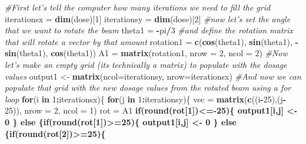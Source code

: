 \documentclass[]{article}
\newenvironment{Shaded}{\begin{snugshade}}{\end{snugshade}}
\newcommand{\KeywordTok}[1]{\textcolor[rgb]{0.13,0.29,0.53}{\textbf{#1}}}
\newcommand{\DataTypeTok}[1]{\textcolor[rgb]{0.13,0.29,0.53}{#1}}
\newcommand{\DecValTok}[1]{\textcolor[rgb]{0.00,0.00,0.81}{#1}}
\newcommand{\StringTok}[1]{\textcolor[rgb]{0.31,0.60,0.02}{#1}}
\newcommand{\CommentTok}[1]{\textcolor[rgb]{0.56,0.35,0.01}{\textit{#1}}}
\newcommand{\ControlFlowTok}[1]{\textcolor[rgb]{0.13,0.29,0.53}{\textbf{#1}}}
\newcommand{\OperatorTok}[1]{\textcolor[rgb]{0.81,0.36,0.00}{\textbf{#1}}}
\newcommand{\NormalTok}[1]{#1}
\begin{document}
\begin{Shaded}
\begin{Highlighting}[]
\CommentTok{#First let's tell the computer how many iterations we need to fill the grid}
\NormalTok{iterationsx =}\StringTok{ }\KeywordTok{dim}\NormalTok{(dose)[}\DecValTok{1}\NormalTok{]}
\NormalTok{iterationsy =}\StringTok{ }\KeywordTok{dim}\NormalTok{(dose)[}\DecValTok{2}\NormalTok{]}
\CommentTok{#now let's set the angle that we want to rotate the beam}
\NormalTok{theta1 =}\StringTok{ }\OperatorTok{-}\NormalTok{pi}\OperatorTok{/}\DecValTok{3}
\CommentTok{#and define the rotation matrix that will rotate a vector by that amount}
\NormalTok{rotation1 =}\StringTok{ }\KeywordTok{c}\NormalTok{(}\KeywordTok{cos}\NormalTok{(theta1), }\KeywordTok{sin}\NormalTok{(theta1), }\OperatorTok{-}\KeywordTok{sin}\NormalTok{(theta1), }\KeywordTok{cos}\NormalTok{(theta1))}
\NormalTok{A1 =}\StringTok{ }\KeywordTok{matrix}\NormalTok{(rotation1, }\DataTypeTok{nrow =} \DecValTok{2}\NormalTok{, }\DataTypeTok{ncol =} \DecValTok{2}\NormalTok{)}
\CommentTok{#Now let's make an empty grid (its technically a matrix) to populate with the dosage values}
\NormalTok{output1 <-}\StringTok{ }\KeywordTok{matrix}\NormalTok{(}\DataTypeTok{ncol=}\NormalTok{iterationsy, }\DataTypeTok{nrow=}\NormalTok{iterationsx)}
\CommentTok{#And now we can populate that grid with the new dosage values from the rotated beam using a for loop}
\ControlFlowTok{for}\NormalTok{(i }\ControlFlowTok{in} \DecValTok{1}\OperatorTok{:}\NormalTok{iterationsx)\{}
  \ControlFlowTok{for}\NormalTok{(j }\ControlFlowTok{in} \DecValTok{1}\OperatorTok{:}\NormalTok{iterationsy)\{}
\NormalTok{    vec =}\StringTok{ }\KeywordTok{matrix}\NormalTok{(}\KeywordTok{c}\NormalTok{((i}\OperatorTok{-}\DecValTok{25}\NormalTok{),(j}\OperatorTok{-}\DecValTok{25}\NormalTok{)), }\DataTypeTok{nrow =} \DecValTok{2}\NormalTok{, }\DataTypeTok{ncol =} \DecValTok{1}\NormalTok{)}
\NormalTok{    rot =}\StringTok{ }\NormalTok{A1 }\OperatorTok{%
    \ControlFlowTok{if}\NormalTok{(}\KeywordTok{round}\NormalTok{(rot[}\DecValTok{1}\NormalTok{])}\OperatorTok{<=-}\DecValTok{25}\NormalTok{)\{}
\NormalTok{      output1[i,j] <-}\StringTok{ }\DecValTok{0}
\NormalTok{    \} }\ControlFlowTok{else}\NormalTok{ \{}\ControlFlowTok{if}\NormalTok{(}\KeywordTok{round}\NormalTok{(rot[}\DecValTok{1}\NormalTok{])}\OperatorTok{>=}\DecValTok{25}\NormalTok{)\{}
\NormalTok{      output1[i,j] <-}\StringTok{ }\DecValTok{0}
\NormalTok{    \} }\ControlFlowTok{else}\NormalTok{ \{}\ControlFlowTok{if}\NormalTok{(}\KeywordTok{round}\NormalTok{(rot[}\DecValTok{2}\NormalTok{])}\OperatorTok{>=}\DecValTok{25}\NormalTok{)\{}
}
\end{Highlighting}
\end{Shaded}
\end{document}
